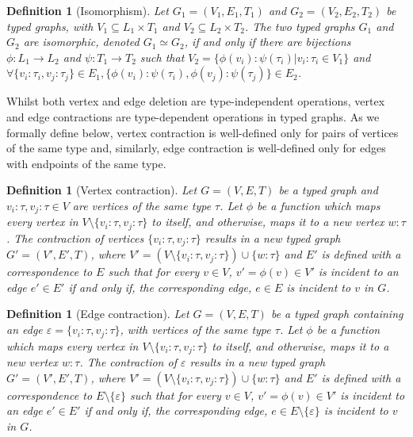 \documentclass[preprint,12pt]{elsarticle}
\theoremstyle{plain}
\newtheorem{definition}[theorem]{Definition}
\newcommand\tyv[2]{#1\!\!:\!\!#2}
\begin{document}
\begin{definition}[Isomorphism]
Let $G_1 = (V_1,E_1,T_1)$ and $G_2 = (V_2,E_2,T_2)$ be typed graphs,
with $V_1 \subseteq L_1\times T_1$ and $V_2 \subseteq L_2\times T_2$.
The two typed graphs $G_1$ and $G_2$ are isomorphic, denoted $G_1 \simeq G_2$,
if and only if there are bijections $\phi:L_1 \rightarrow L_2$ and $\psi:T_1 \rightarrow T_2$
such that
$V_2 = \{\tyv{\phi(v_i)}{\psi(\tau_i)}|\tyv{v_i}{\tau_i}\in V_1\}$ and
$\forall \{\tyv{v_i}{\tau_i}, \tyv{v_j}{\tau_j}\}\in E_1,\{\tyv{\phi(v_i)}{\psi(\tau_i)}, \tyv{\phi(v_j)}{\psi(\tau_j)}\}\in E_2$.
\end{definition}

Whilst both vertex and edge deletion are type-independent operations,
vertex and edge contractions are type-dependent operations in
typed graphs. As we formally define below,
vertex contraction is well-defined only for pairs of vertices of the same type
and, similarly, edge contraction is well-defined only for edges with endpoints of the same type.

\begin{definition}[Vertex contraction]
Let $G = (V,E,T)$ be a typed graph
and $\tyv{v_i}{\tau},\tyv{v_j}{\tau}\in V$ are vertices of the same type $\tau$.
Let $\phi$ be a function which maps every vertex in $V\setminus\{\tyv{v_i}{\tau}, \tyv{v_j}{\tau}\}$ to itself, and otherwise,
maps it to a new vertex $\tyv{w}{\tau}$.
The contraction of vertices $\{\tyv{v_i}{\tau}, \tyv{v_j}{\tau}\}$ results in a new typed graph
$G'=(V',E',T)$,
where $V'=(V\setminus\{\tyv{v_i}{\tau}, \tyv{v_j}{\tau}\})\cup\{\tyv{w}{\tau}\}$ and $E'$ is defined with a correspondence to $E$ such that
for every $v\in V$, $v'=\phi(v)\in V'$ is incident to an edge $e'\in E'$ if and only if, the corresponding edge, $e\in E$ is incident to $v$ in $G$.
\end{definition}

\begin{definition}[Edge contraction]
Let $G = (V,E,T)$ be a typed graph
containing an edge $\varepsilon=\{\tyv{v_i}{\tau}, \tyv{v_j}{\tau}\}$,
with vertices of the same type $\tau$.
Let $\phi$ be a function which maps every vertex in $V\setminus\{\tyv{v_i}{\tau}, \tyv{v_j}{\tau}\}$ to itself, and otherwise,
maps it to a new vertex $\tyv{w}{\tau}$.
The contraction of $\varepsilon$ results in a new typed graph
$G'=(V',E',T)$,
where $V'=(V\setminus\{\tyv{v_i}{\tau}, \tyv{v_j}{\tau}\})\cup\{\tyv{w}{\tau}\}$ and $E'$ is defined with a correspondence to $E\setminus\{\varepsilon\}$ such that
for every $v\in V$, $v'=\phi(v)\in V'$ is incident to an edge $e'\in E'$ if and only if, the corresponding edge, $e\in E\setminus\{\varepsilon\}$ is incident to $v$ in $G$.
\end{definition}
\end{document}
